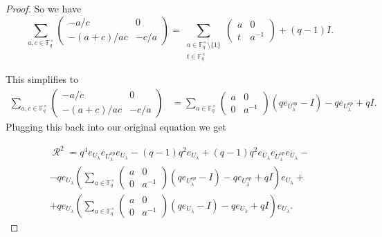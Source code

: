 \documentclass[12pt,reqno]{amsart}
\theoremstyle{definition}
\theoremstyle{remark}
\numberwithin{equation}{section}
\DeclareMathOperator{\R}{\mathcal{R}}
\begin{document}
\begin{proof}
So we have
\[
\sum_{a, c \in \mathbb{F}_q^{\times}}\begin{pmatrix}
    -a/c & 0 \\
    -(a+c)/ac & -c/a 
    \end{pmatrix} = 
\sum_{\substack{a \in \mathbb{F}_q^\times \setminus \{1\}\\ t\in \mathbb{F}_q^{\times}}} \begin{pmatrix}
a & 0 \\
t & a^{-1}
\end{pmatrix} + (q-1) I.\]

This simplifies to
\begin{align*}
    \sum_{a, c \in \mathbb{F}_q^{\times}}\begin{pmatrix}
    -a/c & 0 \\
    -(a+c)/ac & -c/a 
    \end{pmatrix} &= \sum_{a \in \mathbb{F}_q^\times} \begin{pmatrix}
    a & 0 \\
    0 & a^{-1}
    \end{pmatrix} (qe_{U_{\lambda}^{op}} - I)- qe_{U_{\lambda}^{op}}+q I.
\end{align*}
Plugging this back into our original equation we get

\begin{multline*}
    \R^2 =  q^4e_{U_{\lambda}}e_{U_{\lambda}^{op}}e_{U_{\lambda}} -  (q-1) q^2e_{U_{\lambda}} +  (q-1) q^2e_{U_{\lambda}}e_{U_{\lambda}^{op}}e_{U_{\lambda}}-\\
    - qe_{U_{\lambda}} \left( \sum_{a \in \mathbb{F}_q^\times} \begin{pmatrix}
    a & 0 \\
    0 & a^{-1}
    \end{pmatrix} (qe_{U_{\lambda}^{op}} - I)- qe_{U_{\lambda}^{op}}+q I\right) e_{U_{\lambda}}+\\
    + qe_{U_{\lambda}} \left(  \sum_{a \in \mathbb{F}_q^\times} \begin{pmatrix}
    a & 0 \\
    0 & a^{-1}
    \end{pmatrix} (qe_{U_{\lambda}} - I)- qe_{U_{\lambda}}+q I \right) e_{U_{\lambda}}.
\end{multline*}


\end{proof}
\end{document}
